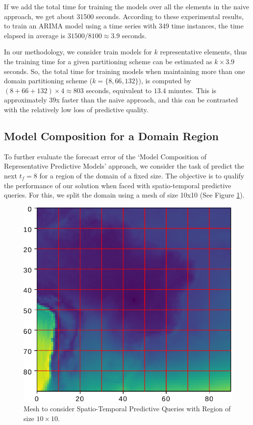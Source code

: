 If we add the total time for training the models over all the elements in the naive approach, we get about 31500 seconds. According to these experimental results, to train an ARIMA model using a time series with 349 time instances, the time elapsed in average is $31500 / 8100 \approx 3.9$ seconds. 

In our methodology, we consider train models for $k$ representative elements, thus the training time for a given partitioning scheme can be estimated as $k \times 3.9$ seconds. So, the total time for training models when maintaining more than one domain partitioning scheme ($k = \{8, 66, 132\}$), is computed by $(8 + 66  + 132) \times 4 \approx 803$ seconds, equivalent to $13.4$ minutes. This is approximately $39$x faster than the naive approach, and this can be contrasted with the relatively low loss of predictive quality.

\subsection{Model Composition for a Domain Region}
\label{Sec:ModelCompositionAggregated}

To further evaluate the forecast error of the `Model Composition of Representative Predictive Models’ approach, we consider the task of predict the next $t_{f}=8$ for a region of the domain of a fixed size. The objective is to qualify the performance of our solution when faced with spatio-temporal predictive queries. For this, we split the domain using a mesh of size 10x10 (See Figure \ref{Fig:Query_10x10_whole_real_brazil}).

\begin{figure}[h]
	\centering
	\includegraphics[scale=0.75]{../Figures/query_10x10_whole_real_brazil}
	\caption{Mesh to consider Spatio-Temporal Predictive Queries with Region of size $10 \times 10$.}
	\label{Fig:Query_10x10_whole_real_brazil}
\end{figure}

